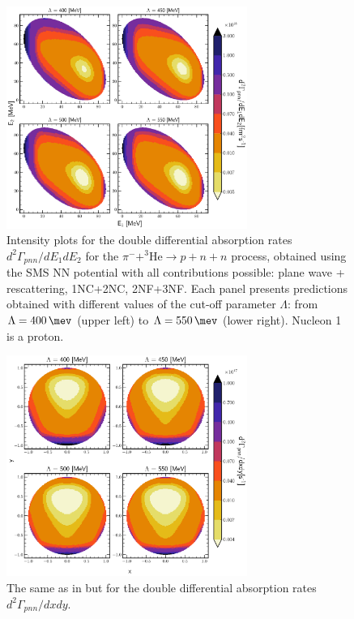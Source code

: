         \begin{figure}[h]
            \begin{center}
            \includegraphics[width=0.7\textwidth]{PlotData/PION/Dalitz_maps/figures/Dalitz_map_pnn_E1E2_cutofs.pdf}
            \end{center}
            \caption{Intensity plots for the double differential absorption rates
            $d^2 \Gamma_{pnn}/dE_1dE_2$ for the $\pi^- + ^3\text{He} \rightarrow p + n + n$ process, obtained using the SMS NN potential
            with all contributions possible: plane wave + rescattering, 1NC+2NC, 2NF+3NF.
            Each panel presents predictions obtained with different values of the cut-off parameter $\Lambda$:
            from $\Lambda=\SI{400}{\mev}$ (upper left) to $\Lambda=\SI{550}{\mev}$ (lower right). Nucleon 1 is a proton.}
            \label{pion_map_E1E2_cutoff}
        \end{figure}

    \begin{figure}[h]
        \begin{center}
        \includegraphics[width=0.7\textwidth]{PlotData/PION/Dalitz_maps/figures/Dalitz_map_pnn_xy_cutofs.pdf}
        \end{center}
        \caption{The same as in  but for the double differential absorption rates
        $d^2 \Gamma_{pnn}/dxdy$.}
        \label{pion_map_xy_cutoff}
    \end{figure}

